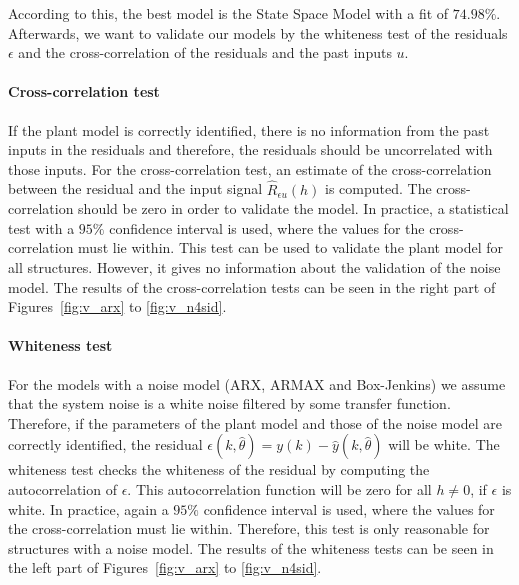 According to this, the best model is the State Space Model with a fit of $74.98 \% $. \\

Afterwards, we want to validate our models by the whiteness test of the residuals  $\epsilon$ and the cross-correlation of the residuals and the past inputs $u$.

\paragraph{Cross-correlation test} If the plant model is correctly identified, there is no information from the past inputs in the residuals and therefore, the residuals should be uncorrelated with those inputs. 
For the cross-correlation test, an estimate of the cross-correlation between the residual and the input signal $\hat{R}_{\epsilon u}(h)$ is computed. The cross-correlation should be zero in order to validate the model. In practice, a statistical test with a $95\%$ confidence interval is used, where the values for the cross-correlation must lie within. This test can be used to validate the plant model for all structures. However, it gives no information about the validation of the noise model. 
The results of the cross-correlation tests can be seen in the right part of Figures~\ref{fig:v_arx} to \ref{fig:v_n4sid}. 

\paragraph{Whiteness test} For the models with a noise model (ARX, ARMAX and Box-Jenkins) we assume that the system noise is a white noise filtered by some transfer function. Therefore, if the parameters of the plant model and those of the noise model are correctly identified, the residual $\epsilon (k, \hat{\theta}) = y(k) - \hat{y}(k, \hat{\theta})$ will be white.
The whiteness test checks the whiteness of the residual by computing the autocorrelation of $\epsilon$. This autocorrelation function will be zero for all $h \neq 0$, if $\epsilon$ is white. In practice, again a $95\%$ confidence interval is used, where the values for the cross-correlation must lie within.
Therefore, this test is only reasonable for structures with a noise model.
The results of the whiteness tests can be seen in the left part of Figures~\ref{fig:v_arx} to \ref{fig:v_n4sid}. 


